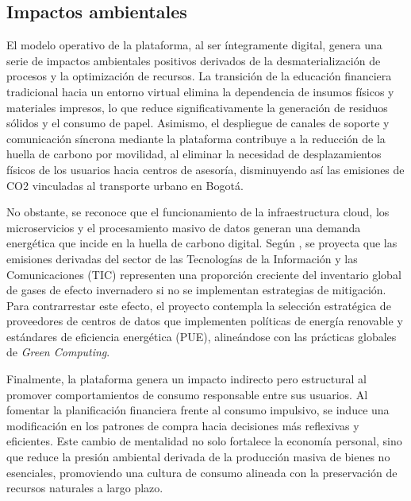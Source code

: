 \subsection*{Impactos ambientales}

El modelo operativo de la plataforma, al ser íntegramente digital, genera una serie de impactos ambientales positivos derivados de la desmaterialización de procesos y la optimización de recursos. La transición de la educación financiera tradicional hacia un entorno virtual elimina la dependencia de insumos físicos y materiales impresos, lo que reduce significativamente la generación de residuos sólidos y el consumo de papel. Asimismo, el despliegue de canales de soporte y comunicación síncrona mediante la plataforma contribuye a la reducción de la huella de carbono por movilidad, al eliminar la necesidad de desplazamientos físicos de los usuarios hacia centros de asesoría, disminuyendo así las emisiones de CO2 vinculadas al transporte urbano en Bogotá.

No obstante, se reconoce que el funcionamiento de la infraestructura cloud, los microservicios y el procesamiento masivo de datos generan una demanda energética que incide en la huella de carbono digital. Según \textcite{Belkhir2018}, se proyecta que las emisiones derivadas del sector de las Tecnologías de la Información y las Comunicaciones (TIC) representen una proporción creciente del inventario global de gases de efecto invernadero si no se implementan estrategias de mitigación. Para contrarrestar este efecto, el proyecto contempla la selección estratégica de proveedores de centros de datos que implementen políticas de energía renovable y estándares de eficiencia energética (PUE), alineándose con las prácticas globales de \textit{Green Computing}.

Finalmente, la plataforma genera un impacto indirecto pero estructural al promover comportamientos de consumo responsable entre sus usuarios. Al fomentar la planificación financiera frente al consumo impulsivo, se induce una modificación en los patrones de compra hacia decisiones más reflexivas y eficientes. Este cambio de mentalidad no solo fortalece la economía personal, sino que reduce la presión ambiental derivada de la producción masiva de bienes no esenciales, promoviendo una cultura de consumo alineada con la preservación de recursos naturales a largo plazo.